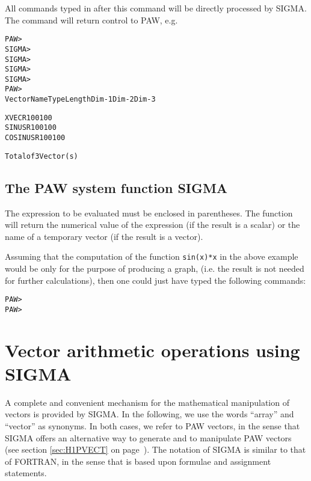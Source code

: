 All commands typed in after this command will be directly processed by
SIGMA. The command  will return control to PAW, e.g.

\begin{alltt}
  PAW > 
  SIGMA > 
  SIGMA > 
  SIGMA > 
  SIGMA > 
  PAW > 
   Vector Name                    Type    Length    Dim-1    Dim-2    Dim-3
 
   XVEC                              R       100      100
   SINUS                             R       100      100
   COSINUS                           R       100      100
 
   Total of  3 Vector(s)
\end{alltt}

\subsection*{The PAW system function \dollar SIGMA}
\label{sec:H3SIGVE}
 
The expression to be evaluated must be
enclosed in parentheses. The function will return the numerical
value of the expression (if the result is a scalar) or the
name of a temporary vector (if the result is a vector).
 
Assuming that the computation of the function \texttt{sin(x)*x}
in the above
example would be only for the purpose of producing a graph, (i.e.
the result is not needed for further calculations), then one could
just have typed the following commands:

\begin{alltt}
  PAW > 
  PAW > 
\end{alltt}

\section{Vector arithmetic operations using SIGMA}
 
A complete and convenient mechanism for the mathematical
manipulation of vectors is provided by SIGMA. In the following,
we use the words ``array'' and ``vector'' as synonyms. 
In both
cases, we refer to PAW vectors, in the sense that SIGMA offers
an alternative way to generate and to manipulate PAW vectors
(see section \ref{sec:H1PVECT} on page~\pageref{sec:H1PVECT}).
The notation of SIGMA is similar to that of FORTRAN, in the sense
that is based upon formulae and assignment statements.
 
